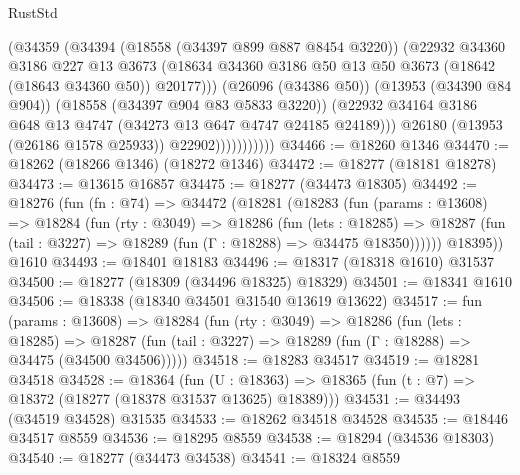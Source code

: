 \begin{lexlean}{RustStd}
\begin{coremodule}
                          (@34359
                            (@34394
                              (@18558 (@34397 @899 @887 @8454 @3220))
                              (@22932
                                @34360
                                @3186
                                @227
                                @13
                                @3673
                                (@18634
                                  @34360
                                  @3186
                                  @50
                                  @13
                                  @50
                                  @3673
                                  (@18642 (@18643 @34360 @50))
                                  @20177)))
                            (@26096 (@34386 @50))
                            (@13953 (@34390 @84 @904))
                            (@18558 (@34397 @904 @83 @5833 @3220))
                            (@22932
                              @34164
                              @3186
                              @648
                              @13
                              @4747
                              (@34273 @13 @647 @4747 @24185 @24189)))
                          @26180
                          (@13953 (@26186 @1578 @25933))
                          @22902)))))))))))
@34466 := @18260 @1346
@34470 := @18262 (@18266 @1346) (@18272 @1346)
@34472 := @18277 (@18181 @18278)
@34473 := @13615 @16857
@34475 := @18277 (@34473 @18305)
@34492 := @18276
    (fun (fn : @74) =>
    @34472
      (@18281
        (@18283
          (fun (params : @13608) =>
          @18284
            (fun (rty : @3049) =>
            @18286
              (fun (lets : @18285) =>
              @18287 (fun (tail : @3227) => @18289 (fun (Γ : @18288) => @34475 @18350))))))
        @18395))
    @1610
@34493 := @18401 @18183
@34496 := @18317 (@18318 @1610) @31537
@34500 := @18277 (@18309 (@34496 @18325) @18329)
@34501 := @18341 @1610
@34506 := @18338 (@18340 @34501 @31540 @13619 @13622)
@34517 := fun (params : @13608) =>
  @18284
    (fun (rty : @3049) =>
    @18286
      (fun (lets : @18285) =>
      @18287 (fun (tail : @3227) => @18289 (fun (Γ : @18288) => @34475 (@34500 @34506)))))
@34518 := @18283 @34517
@34519 := @18281 @34518
@34528 := @18364
    (fun (U : @18363) => @18365 (fun (t : @7) => @18372 (@18277 (@18378 @31537 @13625) @18389)))
@34531 := @34493 (@34519 @34528) @31535
@34533 := @18262 @34518 @34528
@34535 := @18446 @34517 @8559
@34536 := @18295 @8559
@34538 := @18294 (@34536 @18303)
@34540 := @18277 (@34473 @34538)
@34541 := @18324 @8559

\end{coremodule}
\end{lexlean}
